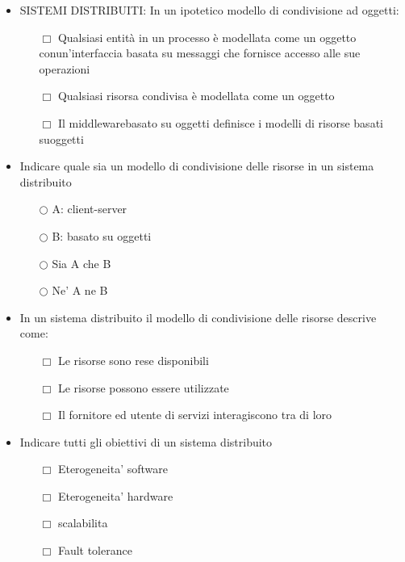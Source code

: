 \documentclass[10pt,twocolumn]{article}
\begin{document}
\begin{itemize}
    \item SISTEMI DISTRIBUITI: In un ipotetico modello di condivisione ad oggetti:
          \begin{itemize}
              \item[$\Box$] Qualsiasi entità in un processo è modellata come un oggetto conun'interfaccia basata su messaggi che fornisce accesso alle sue operazioni
              \item[$\Box$] Qualsiasi risorsa condivisa è modellata come un oggetto
              \item[$\Box$] Il middlewarebasato su oggetti definisce i modelli di risorse basati suoggetti
          \end{itemize}
\end{itemize}
\begin{itemize}
    \item Indicare quale sia un modello di condivisione delle risorse in un sistema distribuito
          \begin{itemize}
              \item[$\bigcirc$] A: client-server
              \item[$\bigcirc$] B: basato su oggetti
              \item[$\bigcirc$] Sia A che B
              \item[$\bigcirc$] Ne' A ne B
          \end{itemize}
\end{itemize}
\begin{itemize}
    \item In un sistema distribuito il modello di condivisione delle risorse descrive come:
          \begin{itemize}
              \item[$\Box$] Le risorse sono rese disponibili
              \item[$\Box$] Le risorse possono essere utilizzate
              \item[$\Box$] Il fornitore ed utente di servizi interagiscono tra di loro
          \end{itemize}
\end{itemize}
\begin{itemize}
    \item Indicare tutti gli obiettivi di un sistema distribuito
          \begin{itemize}
              \item[$\Box$] Eterogeneita' software
              \item[$\Box$] Eterogeneita' hardware
              \item[$\Box$] scalabilita
              \item[$\Box$] Fault tolerance
          \end{itemize}
\end{itemize}
\end{document}
